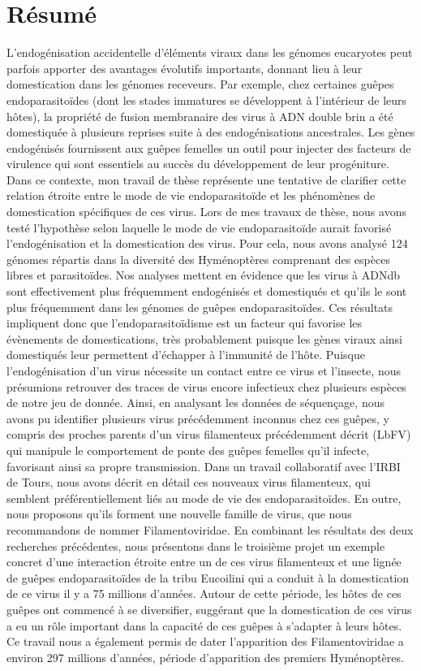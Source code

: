 \thispagestyle{empty}

\section*{Résumé}
L'endogénisation accidentelle d'éléments viraux dans les génomes eucaryotes peut parfois apporter des avantages évolutifs importants, donnant lieu à leur domestication dans les génomes receveurs. Par exemple, chez certaines guêpes endoparasitoïdes (dont les stades immatures se développent à l'intérieur de leurs hôtes), la propriété de fusion membranaire des virus à ADN double brin a été domestiquée à plusieurs reprises suite à des endogénisations ancestrales. Les gènes endogénisés fournissent aux guêpes femelles un outil pour injecter des facteurs de virulence qui sont essentiels au succès du développement de leur progéniture. Dans ce contexte, mon travail de thèse représente une tentative de clarifier cette relation étroite entre le mode de vie endoparasitoïde et les phénomènes de domestication spécifiques de ces virus. Lors de mes travaux de thèse, nous avons testé l'hypothèse selon laquelle le mode de vie endoparasitoïde aurait favorisé l'endogénisation et la domestication des virus. Pour cela, nous avons analysé 124 génomes répartis dans la diversité des Hyménoptères comprenant des espèces libres et parasitoïdes. Nos analyses mettent en évidence que les virus à ADNdb sont effectivement plus fréquemment endogénisés et domestiqués et qu'ils le sont plus fréquemment dans les génomes de guêpes endoparasitoïdes. Ces résultats impliquent donc que l'endoparasitoïdisme est un facteur qui favorise les évènements de domestications, très probablement puisque les gènes viraux ainsi domestiqués leur permettent d'échapper à l'immunité de l'hôte. Puisque l'endogénisation d'un virus nécessite un contact entre ce virus et l'insecte, nous présumions retrouver des traces de virus encore infectieux chez plusieurs espèces de notre jeu de donnée. Ainsi, en analysant les données de séquençage, nous avons pu identifier plusieurs virus précédemment inconnus chez ces guêpes, y compris des proches parents d'un virus filamenteux précédemment décrit (LbFV) qui manipule le comportement de ponte des guêpes femelles qu'il infecte, favorisant ainsi sa propre transmission. Dans un travail collaboratif avec l'IRBI de Tours, nous avons décrit en détail ces nouveaux virus filamenteux, qui semblent préférentiellement liés au mode de vie des endoparasitoïdes. En outre, nous proposons qu'ils forment une nouvelle famille de virus, que nous recommandons de nommer Filamentoviridae. En combinant les résultats des deux recherches précédentes, nous présentons dans le troisième projet un exemple concret d'une interaction étroite entre un de ces virus filamenteux et une lignée de guêpes endoparasitoïdes de la tribu Eucoilini qui a conduit à la domestication de ce virus il y a 75 millions d'années. Autour de cette période, les hôtes de ces guêpes ont commencé à se diversifier, suggérant que la domestication de ces virus a eu un rôle important dans la capacité de ces guêpes à s'adapter à leurs hôtes. Ce travail nous a également permis de dater l'apparition des Filamentoviridae a environ 297 millions d'années, période d'apparition des premiers Hyménoptères. 